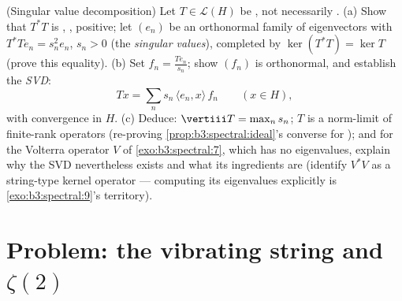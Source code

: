 \begin{exercise}[$\star\star\star$]\label{exo:b3:spectral:12}
(Singular value decomposition) Let $T \in \mathcal L(H)$ be
\emph{}, not necessarily .
(a) Show that $T^*T$ is , , positive; let
$(e_n)$ be an orthonormal family of eigenvectors with
$T^*Te_n = s_n^2e_n$, $s_n > 0$ (the \emph{singular values}),
completed by $\ker(T^*T) = \ker T$ (prove this equality).
(b) Set $f_n = \frac{Te_n}{s_n}$; show $(f_n)$ is
orthonormal, and establish the \emph{SVD}:
\[
Tx = \sum_n s_n\,\langle e_n, x\rangle\,f_n
\qquad (x \in H),
\]
with convergence in $H$.
(c) Deduce: $\vertiii T = \max_ns_n$; $T$ is a norm-limit of
finite-rank operators (re-proving
\cref{prop:b3:spectral:ideal}'s converse for ); and for the Volterra operator $V$ of
\cref{exo:b3:spectral:7}, which has no eigenvalues, explain
why the SVD nevertheless exists and what its ingredients are
(identify $V^*V$ as a string-type kernel operator ---
computing its eigenvalues explicitly is
\cref{exo:b3:spectral:9}'s territory).
\end{exercise}

\section{Problem: the vibrating string and
\texorpdfstring{$\zeta(2)$}{zeta(2)}}

